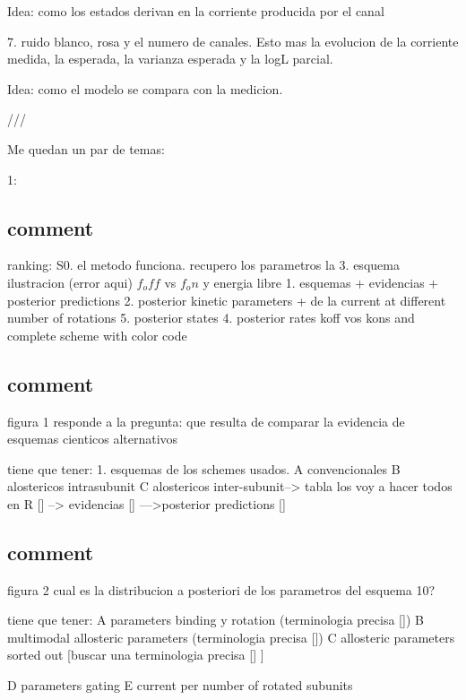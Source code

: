 \documentclass[a4paper,12pt]{article}
\begin{document}
		Idea: como los estados derivan en la corriente producida por el canal
		
		
		7. ruido blanco, rosa y el numero de canales. 
		Esto mas la evolucion de la corriente medida, la esperada, la varianza esperada y la logL parcial.
		
		Idea: como el modelo se compara con la medicion. 
		
		
		///
		
		Me quedan un par de temas: 
		
		1: 
		
		
	
	
	\subsection{comment}
		ranking:
		S0. el metodo funciona. 
		recupero los parametros
		la  
		3. esquema ilustracion (error aqui)  $f_off$ vs $f_on$ y energia libre 
		1.  esquemas + evidencias + posterior predictions
		2. posterior kinetic parameters  + de la current at different number of rotations
		5. posterior states 
		4. posterior rates koff vos kons and complete scheme with color code
		
		
	
	
	
	\subsection{comment}
		figura 1
		responde a la pregunta: 
		que resulta de comparar la evidencia de esquemas cienticos alternativos
		
		tiene que tener: 
		1. esquemas de los schemes usados. 
		A convencionales
		B alostericos intrasubunit
		C alostericos inter-subunit--> tabla
		los voy a hacer todos en R []
		--> evidencias []
		--->posterior predictions []
	
	
	\subsection{comment}
		figura 2
		cual es la distribucion a posteriori de los parametros del esquema 10?
		
		tiene que tener: 
		A parameters binding y rotation (terminologia precisa [])
		B multimodal allosteric parameters (terminologia precisa [])
		C allosteric parameters sorted out [buscar una terminologia precisa [] ]
		
		D parameters gating
		E current per number of rotated subunits
	
\end{document}
